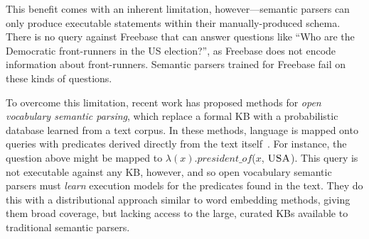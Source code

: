 \documentclass[11pt,letterpaper]{article}
\newcommand{\lexicalpredicate}[1]{\ensuremath{\textit{#1}}}
\newcommand{\formalpredicate}[1]{{\small \ensuremath{\textsc{#1}}}}
\begin{document}
This benefit comes with an inherent limitation, however---semantic parsers can only produce
executable statements within their manually-produced schema.  There is no query against Freebase
that can answer questions like ``Who are the Democratic front-runners in the US election?'', as
Freebase does not encode information about front-runners.  Semantic parsers trained for Freebase
fail on these kinds of questions.

To overcome this limitation, recent work has proposed methods for \emph{open vocabulary semantic
parsing}, which replace a formal KB with a probabilistic database learned from a text corpus.  In
these methods, language is mapped onto queries with predicates derived directly from the text
itself~\cite{lewis-2013-combined-distributional-and-logical-semantics,%
krishnamurthy-2015-semparse-open-vocabulary}.  For instance, the question above might be mapped to
$\lambda(x).$\lexicalpredicate{president\_of}($x$, \formalpredicate{USA}).  This query is not
executable against any KB, however, and so open vocabulary semantic parsers must \emph{learn}
execution models for the predicates found in the text.  They do this with a distributional approach
similar to word embedding methods, giving them broad coverage, but lacking access to the large,
curated KBs available to traditional semantic parsers.
\end{document}
